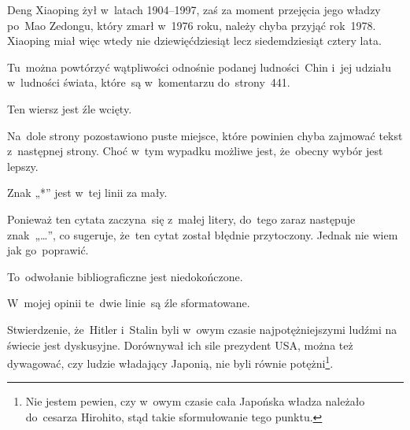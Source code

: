 \documentclass[a4paper,11pt]{article}
\begin{document}
\start {} Deng Xiaoping żył w~latach 1904--1997, zaś za
moment przejęcia jego władzy po~Mao Zedongu, który zmarł w~1976 roku,
należy chyba przyjąć rok~1978. Xiaoping miał więc wtedy nie
dziewięćdziesiąt lecz siedemdziesiąt cztery lata.

\vspace{\spaceFour}



\start {} Tu~można powtórzyć wątpliwości odnośnie podanej
ludności~Chin i~jej udziału w~ludności świata, które~są w~komentarzu
do~strony~441.

\vspace{\spaceFour}



\start {} Ten wiersz jest źle wcięty.

\vspace{\spaceFour}



\start {} Na~dole strony pozostawiono puste miejsce, które
powinien chyba zajmować tekst z~następnej strony. Choć w~tym wypadku
możliwe jest, że~obecny wybór jest lepszy.

\vspace{\spaceFour}



\start {} Znak „*” jest w~tej linii za mały.

\vspace{\spaceFour}



\start {} Ponieważ ten cytata zaczyna~się z~małej litery,
do~tego zaraz następuje znak~„\ldots”, co sugeruje, że~ten cytat został
błędnie przytoczony. Jednak nie wiem jak go~poprawić.

\vspace{\spaceFour}



\start {} To~odwołanie bibliograficzne jest niedokończone.

\vspace{\spaceFour}



\start {} W~mojej opinii te~dwie linie~są źle
sformatowane.

\vspace{\spaceFour}



\start {} Stwierdzenie, że~Hitler i~Stalin byli w~owym czasie
najpotężniejszymi ludźmi na świecie jest dyskusyjne. Dorównywał ich
sile prezydent USA, można też dywagować, czy ludzie władający Japonią,
nie byli równie potężni\footnote{Nie jestem pewien, czy w~owym czasie
  cała Japońska władza należało do~cesarza Hirohito, stąd takie
  sformułowanie tego punktu.}.
\end{document}
